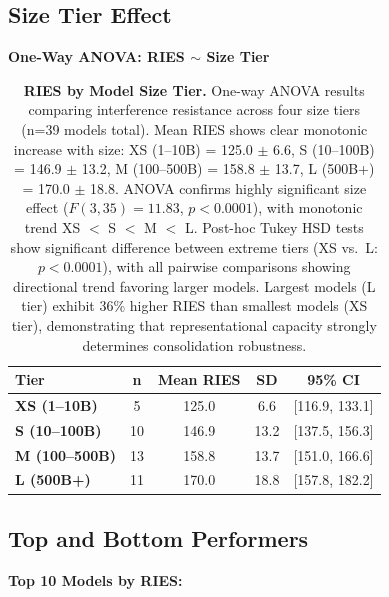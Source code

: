 \documentclass{article}
\begin{document}
\subsection{Size Tier Effect}

\textbf{One-Way ANOVA: RIES $\sim$ Size Tier}

\begin{table}[t]
\centering
\caption{\textbf{RIES by Model Size Tier.}
One-way ANOVA results comparing interference resistance across four size tiers (n=39 models total).
Mean RIES shows clear monotonic increase with size: XS (1--10B) = 125.0 $\pm$ 6.6, S (10--100B) = 146.9 $\pm$ 13.2, M (100--500B) = 158.8 $\pm$ 13.7, L (500B+) = 170.0 $\pm$ 18.8.
ANOVA confirms highly significant size effect ($F(3, 35) = 11.83$, $p < 0.0001$), with monotonic trend XS $<$ S $<$ M $<$ L.
Post-hoc Tukey HSD tests show significant difference between extreme tiers (XS vs.\ L: $p < 0.0001$), with all pairwise comparisons showing directional trend favoring larger models.
Largest models (L tier) exhibit 36\% higher RIES than smallest models (XS tier), demonstrating that representational capacity strongly determines consolidation robustness.}
\begin{tabular}{lcccc}
\toprule
Tier & n & Mean RIES & SD & 95\% CI \\
\midrule
\textbf{XS (1--10B)} & 5 & 125.0 & 6.6 & [116.9, 133.1] \\
\textbf{S (10--100B)} & 10 & 146.9 & 13.2 & [137.5, 156.3] \\
\textbf{M (100--500B)} & 13 & 158.8 & 13.7 & [151.0, 166.6] \\
\textbf{L (500B+)} & 11 & 170.0 & 18.8 & [157.8, 182.2] \\
\bottomrule
\end{tabular}
\end{table}

\subsection{Top and Bottom Performers}

\textbf{Top 10 Models by RIES:}
\end{document}
